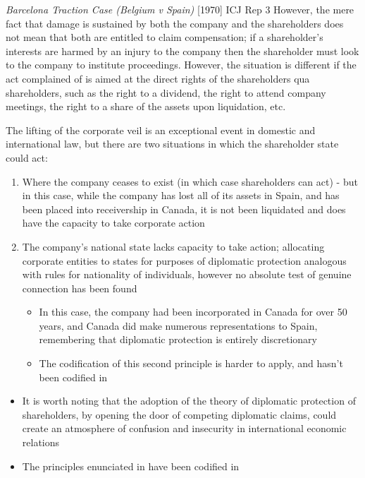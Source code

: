 \begin{casedetails}{\textit{Barcelona Traction Case (Belgium v Spain)} [1970] ICJ Rep 3}
    However, the mere fact that damage is sustained by both the company and the shareholders does not mean that both are entitled to claim compensation; if a shareholder's interests are harmed by an injury to the company then the shareholder must look to the company to institute proceedings. However, the situation is different if the act complained of is aimed at the direct rights of the shareholders \gls{qua} shareholders, such as the right to a dividend, the right to attend company meetings, the right to a share of the assets upon liquidation, etc.

    \vspace{\baselineskip}

    The lifting of the corporate veil is an exceptional event in domestic and international law, but there are two situations in which the shareholder state could act:
    \begin{enumerate}
        \item Where the company ceases to exist (in which case shareholders can act) - but in this case, while the company has lost all of its assets in Spain, and has been placed into receivership in Canada, it is not been liquidated and does have the capacity to take corporate action
        \item The company's national state lacks capacity to take action; allocating corporate entities to states for purposes of diplomatic protection analogous with rules for nationality of individuals, however no absolute test of genuine connection has been found
        \begin{itemize}
            \item In this case, the company had been incorporated in Canada for over 50 years, and Canada did make numerous representations to Spain, remembering that diplomatic protection is entirely discretionary
            \item The codification of this second principle is harder to apply, and hasn't been codified in 
        \end{itemize}
    \end{enumerate}
\end{casedetails}

\begin{itemize}
    \item It is worth noting that the adoption of the theory of diplomatic protection of shareholders, by opening the door of competing diplomatic claims, could create an atmosphere of confusion and insecurity in international economic relations
    \item The principles enunciated in  have been codified in 
\end{itemize}

